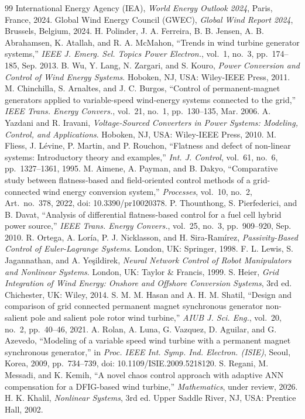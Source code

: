 \documentclass[conference]{IEEEtran}
\begin{document}
\begin{thebibliography}{99}
 International Energy Agency (IEA), \emph{World Energy Outlook 2024}, Paris, France, 2024.
 Global Wind Energy Council (GWEC), \emph{Global Wind Report 2024}, Brussels, Belgium, 2024.
 H. Polinder, J. A. Ferreira, B. B. Jensen, A. B. Abrahamsen, K. Atallah, and
R. A. McMahon, ``Trends in wind turbine generator systems,'' \emph{IEEE J. Emerg. Sel. Topics Power
Electron.}, vol.~1, no.~3, pp.~174--185, Sep. 2013.
 B. Wu, Y. Lang, N. Zargari, and S. Kouro, \emph{Power Conversion and Control of Wind
Energy Systems}. Hoboken, NJ, USA: Wiley-IEEE Press, 2011.
 M. Chinchilla, S. Arnaltes, and J. C. Burgos, ``Control of permanent-magnet
generators applied to variable-speed wind-energy systems connected to the grid,'' \emph{IEEE Trans.
Energy Convers.}, vol.~21, no.~1, pp.~130--135, Mar. 2006.
 A. Yazdani and R. Iravani, \emph{Voltage-Sourced Converters in Power Systems:
Modeling, Control, and Applications}. Hoboken, NJ, USA: Wiley-IEEE Press, 2010.
 M. Fliess, J. L\'evine, P. Martin, and P. Rouchon, ``Flatness and defect of
non-linear systems: Introductory theory and examples,'' \emph{Int. J. Control}, vol.~61, no.~6,
pp.~1327--1361, 1995.
 M. Aimene, A. Payman, and B. Dakyo, ``Comparative study between flatness-based and
field-oriented control methods of a grid-connected wind energy conversion system,'' \emph{Processes},
vol.~10, no.~2, Art.~no.~378, 2022, doi: 10.3390/pr10020378.
 P. Thounthong, S. Pierfederici, and B. Davat, ``Analysis of differential
flatness-based control for a fuel cell hybrid power source,'' \emph{IEEE Trans. Energy Convers.},
vol.~25, no.~3, pp.~909--920, Sep. 2010.
 R. Ortega, A. Lor\'ia, P. J. Nicklasson, and H. Sira-Ram\'irez,
\emph{Passivity-Based Control of Euler-Lagrange Systems}. London, UK: Springer, 1998.
 F. L. Lewis, S. Jagannathan, and A. Ye\c{s}ildirek, \emph{Neural Network Control of
Robot Manipulators and Nonlinear Systems}. London, UK: Taylor \& Francis, 1999.
 S. Heier, \emph{Grid Integration of Wind Energy: Onshore and Offshore Conversion
Systems}, 3rd ed. Chichester, UK: Wiley, 2014.
 S. M. M. Hasan and A. H. M. Shatil, ``Design and comparison of grid connected
permanent magnet synchronous generator non-salient pole and salient pole rotor wind turbine,''
\emph{AIUB J. Sci. Eng.}, vol.~20, no.~2, pp.~40--46, 2021.
 A. Rolan, A. Luna, G. Vazquez, D. Aguilar, and G. Azevedo, ``Modeling of a variable
speed wind turbine with a permanent magnet synchronous generator,'' in \emph{Proc. IEEE Int. Symp. Ind.
Electron. (ISIE)}, Seoul, Korea, 2009, pp.~734--739, doi: 10.1109/ISIE.2009.5218120.
 S. Regani, M. Messadi, and K. Kemih, ``A novel chaos control approach with
adaptive ANN compensation for a DFIG-based wind turbine,'' \emph{Mathematics}, under review, 2026.
 H. K. Khalil, \emph{Nonlinear Systems}, 3rd ed. Upper Saddle River, NJ, USA:
Prentice Hall, 2002.
\end{thebibliography}
\end{document}
